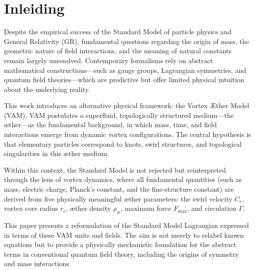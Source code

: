 \section{Inleiding}\label{sec:inleiding}
Despite the empirical success of the Standard Model of particle physics and General Relativity (GR), fundamental questions regarding the origin of mass, the geometric nature of field interactions, and the meaning of natural constants remain largely unresolved. Contemporary formalisms rely on abstract mathematical constructions—such as gauge groups, Lagrangian symmetries, and quantum field theories—which are predictive but offer limited physical intuition about the underlying reality.

This work introduces an alternative physical framework: the Vortex Æther Model (VAM). VAM postulates a superfluid, topologically structured medium—the æther—as the fundamental background, in which mass, time, and field interactions emerge from dynamic vortex configurations. The central hypothesis is that elementary particles correspond to knots, swirl structures, and topological singularities in this æther medium.

Within this context, the Standard Model is not rejected but reinterpreted through the lens of vortex dynamics, where all fundamental quantities (such as mass, electric charge, Planck’s constant, and the fine-structure constant) are derived from five physically meaningful æther parameters: the swirl velocity $C_e$, vortex core radius $r_c$, æther density $\rho_\text{\ae}$, maximum force $F_\text{max}$, and circulation $\Gamma$.

This paper presents a reformulation of the Standard Model Lagrangian expressed in terms of these VAM units and fields. The aim is not merely to relabel known equations but to provide a physically mechanistic foundation for the abstract terms in conventional quantum field theory, including the origins of symmetry and mass interactions.
